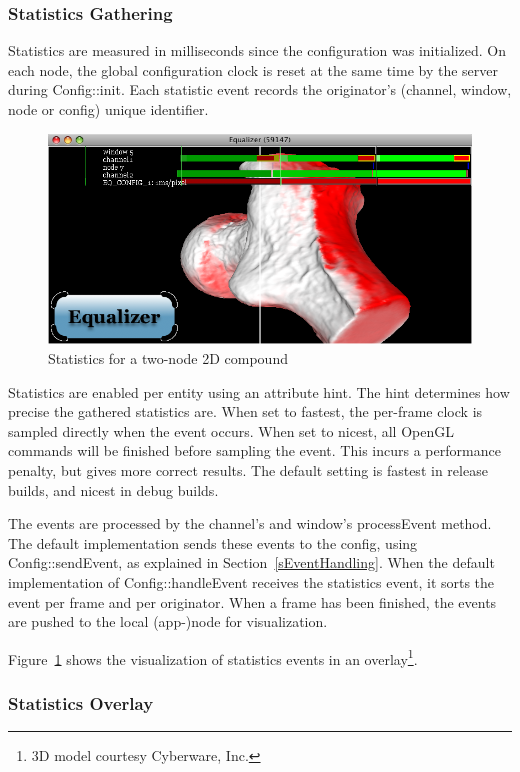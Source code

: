 \documentclass[10pt,a4]{scrartcl}
\newcommand{\fig}[1]{Figure~\ref{#1}}
\newcommand{\sref}[1]{Section~\ref{#1}}
\begin{document}
\subsubsection{Statistics Gathering}

Statistics are measured in milliseconds since the configuration was
initialized. On each node, the global configuration clock is reset at
the same time by the server during \textsf{Config::init}. Each statistic
event records the originator's (channel, window, node or config) unique
identifier.

\begin{figure}
  \includegraphics[width=.618\textwidth]{images/statistics.png}
  {\caption{\small\label{fStatistics}Statistics for a two-node 2D compound}}
\end{figure}
Statistics are enabled per entity using an attribute hint. The hint
determines how precise the gathered statistics are. When set to
\textsf{fastest}, the per-frame clock is sampled directly when the event
occurs. When set to \textsf{nicest}, all OpenGL commands will be
finished before sampling the event. This incurs a performance penalty,
but gives more correct results. The default setting is fastest in
release builds, and nicest in debug builds.

The events are processed by the channel's and window's
\textsf{processEvent} method. The default implementation sends these
events to the config, using \textsf{Config::sendEvent}, as explained in
\sref{sEventHandling}. When the default implementation of
\textsf{Config::handleEvent} receives the statistics event, it sorts the
event per frame and per originator. When a frame has been finished, the
events are pushed to the local (app-)node for visualization.

\fig{fStatistics} shows the visualization of statistics events in an
overlay\footnote{3D model courtesy Cyberware, Inc.}.

\subsubsection{Statistics Overlay}
\end{document}

